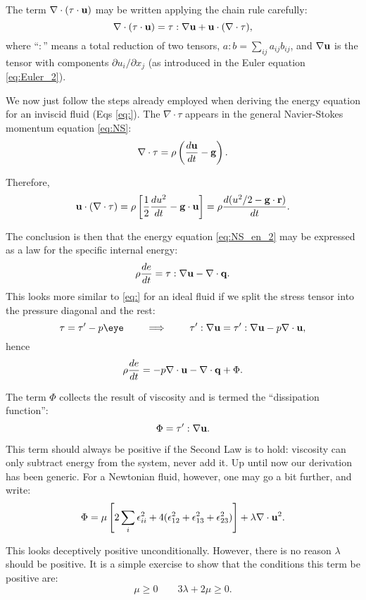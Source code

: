 The term $\nabla\cdot ( \tau \cdot \mathbf{u} )$ may be written applying the
chain rule carefully:
\begin{equation}
  \nabla\cdot ( \tau \cdot  \mathbf{u} ) =
  \tau : \nabla\mathbf{u} + \mathbf{u}\cdot(\nabla\cdot\tau) ,
\label{eq:nabla_tau_u}
\end{equation}
where ``$:$'' means a total reduction of two tensors, $a:b=\sum_{ij}
a_{ij} b_{ij} $, and $\nabla\mathbf{u}$ is the tensor with components
$\partial u_i/\partial x_j$ (as introduced in the Euler
equation \ref{eq:Euler_2}).

We now just follow the steps already employed when deriving the energy
equation for an inviscid fluid (Eqs \ref{eq:}).  The $\nabla\cdot\tau$
appears in the general Navier-Stokes momentum equation \ref{eq:NS}:
\[
 \nabla \cdot \tau =
\rho \left( \frac{d\mathbf{u} }{dt}    - \mathbf{g} \right) .
\]

Therefore,
\[
\mathbf{u}\cdot(\nabla\cdot\tau) =
 \rho \left[
 \frac12 
  \frac{d u^2 }{dt}    - \mathbf{g}\cdot\mathbf{u}
  \right] =
   \rho
  \frac{d (u^2 /2 - \mathbf{g}\cdot\mathbf{r} ) }{dt}    .
\]

The conclusion is then that the energy equation \ref{eq:NS_en_2} may be
expressed as a law for the specific internal energy:
\[
\rho \frac{d e }{dt}  = 
  \tau : \nabla\mathbf{u} - \nabla\cdot\mathbf{q} .
\]
This looks more similar to \ref{eq:} for an ideal fluid if we split the
stress tensor into the pressure diagonal and the rest:
\[
\tau = \tau' - p \eye \qquad \implies \qquad
 \tau' : \nabla\bfu = \tau' : \nabla\bfu - p \divu ,
\]
hence
\[
\rho \frac{d e }{dt}  =  - p \nabla\cdot\mathbf{u} - \nabla\cdot\mathbf{q}  + \Phi .
\]

The term $\Phi$ collects the result of viscosity and is termed
the ``dissipation function'':
\[
\Phi = \tau' : \nabla\mathbf{u} .
\]

This term should always be positive if the Second Law is to hold:
viscosity can only subtract energy from the system, never add it.
Up until now our derivation has been generic. For a Newtonian fluid,
however, one may go a bit further, and write:
\begin{equation}
  \Phi = \mu
  \left[
    2 \sum_i \epsilon_{ii}^2 +
    4  (\epsilon_{12}^2 + \epsilon_{13}^2 + \epsilon_{23}^2 )
  \right]+
  \lambda \nabla\cdot\mathbf{u}^2 .\label{eq:Phi_Newtonian}
\end{equation}

This looks deceptively positive unconditionally. However, there is no
reason $\lambda$ should be positive. It is a simple exercise to show
that the conditions this term be positive are:
\begin{equation}
  \mu \ge 0 \qquad 3\lambda + 2\mu \ge 0 .\label{eq:mu_lambda_cond}
\end{equation}

